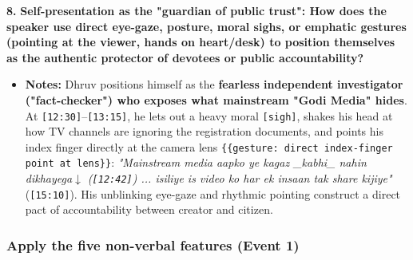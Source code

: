 \documentclass[10pt,a4paper]{article}
\begin{document}
\noindent\textbf{8.} \textbf{Self-presentation as the "guardian of public trust": How does the speaker use direct eye-gaze, posture, moral sighs, or emphatic gestures (pointing at the viewer, hands on heart/desk) to position themselves as the authentic protector of devotees or public accountability?}\par\smallskip
\begin{itemize}
  \item \textbf{Notes:}
Dhruv positions himself as the \textbf{fearless independent investigator ("fact-checker") who exposes what mainstream "Godi Media" hides}. At \texttt{[12:30]}--\texttt{[13:15]}, he lets out a heavy moral \texttt{[sigh]}, shakes his head at how TV channels are ignoring the registration documents, and points his index finger directly at the camera lens \texttt{\{\{gesture: direct index-finger point at lens\}\}}: \textit{"Mainstream media aapko ye kagaz \_kabhi\_ nahin dikhayega$\downarrow$ (\texttt{[12:42]}) ... isiliye is video ko har ek insaan tak share kijiye"} (\texttt{[15:10]}). His unblinking eye-gaze and rhythmic pointing construct a direct pact of accountability between creator and citizen.\par\smallskip
\end{itemize}

\subsubsection*{Apply the five non-verbal features (Event 1)}
\end{document}
